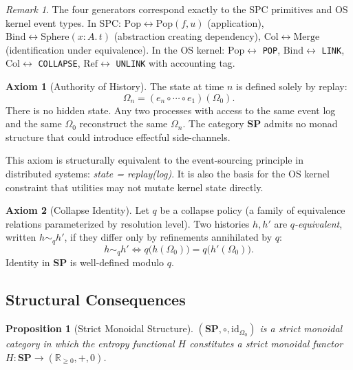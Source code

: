 \documentclass[12pt, a4paper]{article}
\newtheorem{proposition}[theorem]{Proposition}
\theoremstyle{definition}
\newtheorem{axiom}{Axiom}
\theoremstyle{remark}
\newtheorem{remark}[theorem]{Remark}
\newcommand{\Ent}{H}
\newcommand{\Rnn}{\mathbb{R}_{\ge 0}}
\newcommand{\SP}{\mathbf{SP}}
\newcommand{\Pop}{\mathrm{Pop}}
\newcommand{\Refuse}{\mathrm{Ref}}
\newcommand{\Bind}{\mathrm{Bind}}
\newcommand{\Collapse}{\mathrm{Col}}
\newcommand{\id}{\mathrm{id}}
\begin{document}
\begin{remark}
The four generators correspond exactly to the SPC primitives and OS kernel event types.
In SPC: $\Pop \leftrightarrow \mathrm{Pop}(f,u)$ (application), $\Bind \leftrightarrow
\mathrm{Sphere}(x\!:\!A.\,t)$ (abstraction creating dependency), $\Collapse \leftrightarrow
\mathrm{Merge}$ (identification under equivalence). In the OS kernel: $\Pop
\leftrightarrow$ \texttt{POP}, $\Bind \leftrightarrow$ \texttt{LINK}, $\Collapse
\leftrightarrow$ \texttt{COLLAPSE}, $\Refuse \leftrightarrow$ \texttt{UNLINK} with
accounting tag.
\end{remark}

\begin{axiom}[Authority of History]
\label{ax:hist}
The state at time $n$ is defined solely by replay:
\[
  \Omega_n = (e_n \circ \cdots \circ e_1)(\Omega_0).
\]
There is no hidden state. Any two processes with access to the same event log and the
same $\Omega_0$ reconstruct the same $\Omega_n$. The category $\SP$ admits no monad
structure that could introduce effectful side-channels.
\end{axiom}

This axiom is structurally equivalent to the event-sourcing principle in distributed
systems: \emph{state = replay(log)}. It is also the basis for the OS kernel constraint
that utilities may not mutate kernel state directly.

\begin{axiom}[Collapse Identity]
\label{ax:ident}
Let $q$ be a collapse policy (a family of equivalence relations parameterized by
resolution level). Two histories $h, h'$ are \emph{$q$-equivalent}, written
$h \sim_q h'$, if they differ only by refinements annihilated by $q$:
\[
  h \sim_q h' \iff q\bigl(h(\Omega_0)\bigr) = q\bigl(h'(\Omega_0)\bigr).
\]
Identity in $\SP$ is well-defined modulo $q$.
\end{axiom}

\subsection{Structural Consequences}

\begin{proposition}[Strict Monoidal Structure]
\label{prop:monoidal}
$(\SP, \circ, \id_{\Omega_0})$ is a strict monoidal category in which the entropy
functional $\Ent$ constitutes a strict monoidal functor $\Ent : \SP \to (\Rnn, +, 0)$.
\end{proposition}
\end{document}
